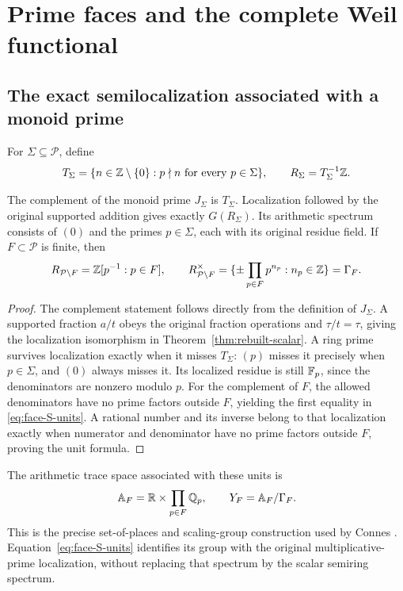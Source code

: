 \section{Prime faces and the complete Weil functional}
\label{sec:prime-faces-weil}
\subsection{The exact semilocalization associated with a monoid prime}
For $\Sigma\subseteq\mathcal P$, define
\[
 T_\Sigma=\{n\in\mathbb Z\setminus\{0\}:p\nmid n\text{ for every }p\in\Sigma\},
 \qquad R_\Sigma=T_\Sigma^{-1}\mathbb Z.
\]
\begin{theorem}\label{thm:face-semilocalization}
The complement of the monoid prime $J_\Sigma$ is $T_\Sigma$. Localization followed by the original supported addition gives exactly $G(R_\Sigma)$. Its arithmetic spectrum consists of $(0)$ and the primes $p\in\Sigma$, each with its original residue field. If $F\subset\mathcal P$ is finite, then
\begin{equation}\label{eq:face-S-units}
 R_{\mathcal P\setminus F}=\mathbb Z[p^{-1}:p\in F],\qquad
 R_{\mathcal P\setminus F}^{\times}
 =\{\pm\prod_{p\in F}p^{n_p}:n_p\in\mathbb Z\}=\Gamma_F.
\end{equation}
\end{theorem}
\begin{proof}
The complement statement follows directly from the definition of $J_\Sigma$. A supported fraction $a/t$ obeys the original fraction operations and $\tau/t=\tau$, giving the localization isomorphism in Theorem~\ref{thm:rebuilt-scalar}. A ring prime survives localization exactly when it misses $T_\Sigma$: $(p)$ misses it precisely when $p\in\Sigma$, and $(0)$ always misses it. Its localized residue is still $\mathbb F_p$, since the denominators are nonzero modulo $p$. For the complement of $F$, the allowed denominators have no prime factors outside $F$, yielding the first equality in \eqref{eq:face-S-units}. A rational number and its inverse belong to that localization exactly when numerator and denominator have no prime factors outside $F$, proving the unit formula.
\end{proof}
The arithmetic trace space associated with these units is
\[
 \mathbb A_F=\mathbb R\times\prod_{p\in F}\mathbb Q_p,\qquad
 Y_F=\mathbb A_F/\Gamma_F.
\]
This is the precise set-of-places and scaling-group construction used by Connes \cite[labels \texttt{YQS}, \texttt{GL1QS}]{Connes2026}. Equation~\eqref{eq:face-S-units} identifies its group with the original multiplicative-prime localization, without replacing that spectrum by the scalar semiring spectrum.

